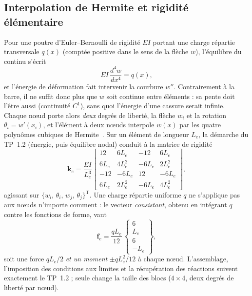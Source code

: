 \documentclass[10pt,journal]{IEEEtran}
\begin{document}
\subsection{Interpolation de Hermite et rigidité élémentaire}
Pour une poutre d'Euler--Bernoulli de rigidité $EI$ portant une charge répartie transversale $q(x)$ (comptée positive dans le sens de la flèche $w$), l'équilibre du continu s'écrit~\cite{gere}
\begin{equation}
EI\,\frac{d^4 w}{dx^4} = q(x),
\label{eq:ode}
\end{equation}
et l'énergie de déformation fait intervenir la courbure $w''$. Contrairement à la barre, il ne suffit donc plus que $w$ soit continue entre éléments : sa pente doit l'être aussi (continuité $C^1$), sans quoi l'énergie d'une \og cassure\fg{} serait infinie. Chaque n\oe{}ud porte alors \emph{deux} degrés de liberté, la flèche $w_i$ et la rotation $\theta_i = w'(x_i)$, et l'élément à deux n\oe{}uds interpole $w(x)$ par les quatre polynômes cubiques de Hermite~\cite{logan}. Sur un élément de longueur $L_e$, la démarche du TP~1.2 (énergie, puis équilibre nodal) conduit à la matrice de rigidité
\begin{equation}
\mathbf{k}_e = \frac{EI}{L_e^3}
\begin{bmatrix}
12 & 6L_e & -12 & 6L_e \\
6L_e & 4L_e^2 & -6L_e & 2L_e^2 \\
-12 & -6L_e & 12 & -6L_e \\
6L_e & 2L_e^2 & -6L_e & 4L_e^2
\end{bmatrix},
\label{eq:ke}
\end{equation}
agissant sur $\{w_i,\,\theta_i,\,w_j,\,\theta_j\}^{\mathrm T}$. Une charge répartie uniforme $q$ ne s'applique pas aux n\oe{}uds n'importe comment : le vecteur \emph{consistant}, obtenu en intégrant $q$ contre les fonctions de forme, vaut
\begin{equation}
\mathbf{f}_e = \frac{qL_e}{12}\,
\begin{Bmatrix} 6 \\ L_e \\ 6 \\ -L_e \end{Bmatrix},
\label{eq:fe}
\end{equation}
soit une force $qL_e/2$ \emph{et un moment} $\pm qL_e^2/12$ à chaque n\oe{}ud. L'assemblage, l'imposition des conditions aux limites et la récupération des réactions suivent exactement le TP~1.2 ; seule change la taille des blocs ($4\times 4$, deux degrés de liberté par n\oe{}ud).
\end{document}
